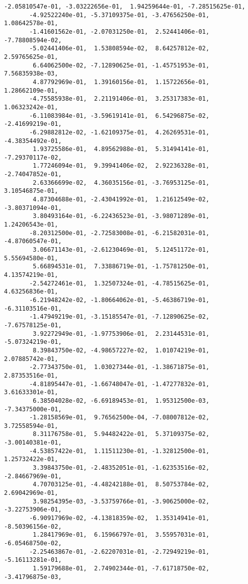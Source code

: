 \documentclass[11pt]{article}
\begin{document}
\begin{tcolorbox}[breakable, size=fbox, boxrule=.5pt, pad at break*=1mm, opacityfill=0]
\begin{Verbatim}[commandchars=\\\{\}]
       -2.05810547e-01, -3.03222656e-01,  1.94259644e-01, -7.28515625e-01,
       -4.92522240e-01, -5.37109375e-01, -3.47656250e-01,  1.08642578e-01,
       -1.41601562e-01, -2.07031250e-01,  2.52441406e-01, -7.78808594e-02,
       -5.02441406e-01,  1.53808594e-02,  8.64257812e-02,  2.59765625e-01,
        6.64062500e-02, -7.12890625e-01, -1.45751953e-01,  7.56835938e-03,
        4.87792969e-01,  1.39160156e-01,  1.15722656e-01,  1.28662109e-01,
       -4.75585938e-01,  2.21191406e-01,  3.25317383e-01,  1.06323242e-01,
       -6.11083984e-01, -3.59619141e-01,  6.54296875e-02, -2.41699219e-01,
       -6.29882812e-02, -1.62109375e-01,  4.26269531e-01, -4.38354492e-01,
        1.93725586e-01,  4.89562988e-01,  5.31494141e-01, -7.29370117e-02,
        1.77246094e-01,  9.39941406e-02,  2.92236328e-01, -2.74047852e-01,
        2.63366699e-02,  4.36035156e-01, -3.76953125e-01,  3.10546875e-01,
        4.87304688e-01, -2.43041992e-01,  1.21612549e-02, -3.80371094e-01,
        3.80493164e-01, -6.22436523e-01, -3.98071289e-01,  1.24206543e-01,
       -8.20312500e-01, -2.72583008e-01, -6.21582031e-01, -4.87060547e-01,
        3.06671143e-01, -2.61230469e-01,  5.12451172e-01,  5.55694580e-01,
        5.66894531e-01,  7.33886719e-01, -1.75781250e-01,  4.13574219e-01,
       -2.54272461e-01,  1.32507324e-01, -4.78515625e-01,  4.63256836e-01,
       -6.21948242e-02, -1.80664062e-01, -5.46386719e-01, -6.31103516e-01,
       -1.47949219e-01, -3.15185547e-01, -7.12890625e-02, -7.67578125e-01,
        3.92272949e-01, -1.97753906e-01,  2.23144531e-01, -5.07324219e-01,
        8.39843750e-02, -4.98657227e-02,  1.01074219e-01,  2.07885742e-01,
       -2.77343750e-01,  1.03027344e-01, -1.38671875e-01,  2.87353516e-01,
       -4.81895447e-01, -1.66748047e-01, -1.47277832e-01,  3.61633301e-01,
        6.38504028e-02, -6.69189453e-01,  1.95312500e-03, -7.34375000e-01,
       -1.28158569e-01,  9.76562500e-04, -7.08007812e-02,  3.72558594e-01,
        8.31176758e-01,  5.94482422e-01,  5.37109375e-02, -3.00140381e-01,
       -4.53857422e-01,  1.11511230e-01, -1.32812500e-01,  1.25732422e-01,
        3.39843750e-01, -2.48352051e-01, -1.62353516e-02, -2.84667969e-01,
        4.70703125e-01, -4.48242188e-01,  8.50753784e-02,  2.69042969e-01,
        3.98254395e-03, -3.53759766e-01, -3.90625000e-02, -3.22753906e-01,
       -6.90917969e-02, -4.13818359e-02,  1.35314941e-01, -8.50396156e-02,
        1.28417969e-01,  6.15966797e-01,  3.55957031e-01, -6.05468750e-02,
       -2.25463867e-01, -2.62207031e-01, -2.72949219e-01, -5.16113281e-01,
        1.59179688e-01,  2.74902344e-01, -7.61718750e-02, -3.41796875e-03,

\end{Verbatim}
\end{tcolorbox}
\end{document}
